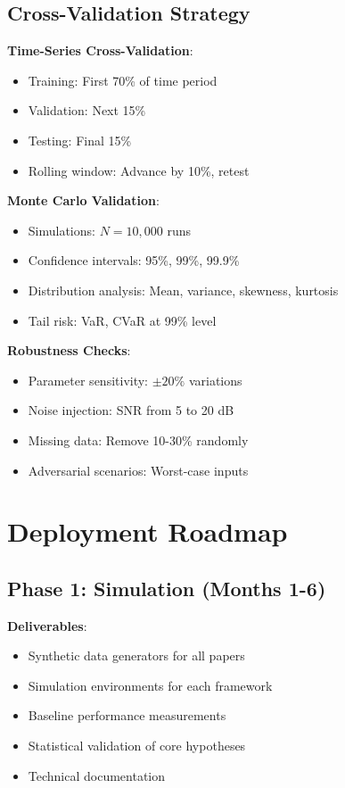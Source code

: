\documentclass[12pt]{article}
\begin{document}
\subsection{Cross-Validation Strategy}

\textbf{Time-Series Cross-Validation}:
\begin{itemize}
    \item Training: First 70\% of time period
    \item Validation: Next 15\%
    \item Testing: Final 15\%
    \item Rolling window: Advance by 10\%, retest
\end{itemize}

\textbf{Monte Carlo Validation}:
\begin{itemize}
    \item Simulations: $N = 10,000$ runs
    \item Confidence intervals: 95\%, 99\%, 99.9\%
    \item Distribution analysis: Mean, variance, skewness, kurtosis
    \item Tail risk: VaR, CVaR at 99\% level
\end{itemize}

\textbf{Robustness Checks}:
\begin{itemize}
    \item Parameter sensitivity: $\pm 20\%$ variations
    \item Noise injection: SNR from 5 to 20 dB
    \item Missing data: Remove 10-30\% randomly
    \item Adversarial scenarios: Worst-case inputs
\end{itemize}

\section{Deployment Roadmap}

\subsection{Phase 1: Simulation (Months 1-6)}

\textbf{Deliverables}:
\begin{itemize}
    \item Synthetic data generators for all papers
    \item Simulation environments for each framework
    \item Baseline performance measurements
    \item Statistical validation of core hypotheses
    \item Technical documentation
\end{itemize}
\end{document}
